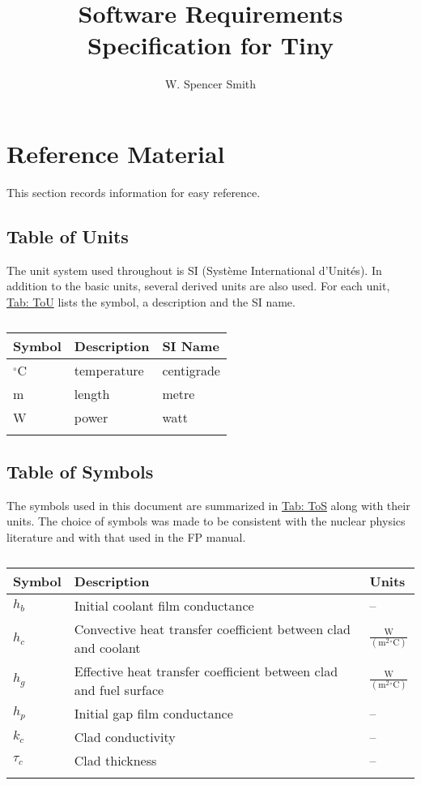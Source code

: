 \documentclass[12pt]{article}
\title{Software Requirements Specification for Tiny}
\author{W. Spencer Smith}
\begin{document}
\maketitle
\tableofcontents
\newpage
\section{Reference Material}
\label{Sec:RefMat}
This section records information for easy reference.
\subsection{Table of Units}
\label{Sec:ToU}
The unit system used throughout is SI (Système International d'Unités). In addition to the basic units, several derived units are also used. For each unit, \hyperref[Table:ToU]{Tab: ToU} lists the symbol, a description and the SI name.
\begin{longtable}{l l l}
\toprule
\textbf{Symbol} & \textbf{Description} & \textbf{SI Name}
\\
\midrule
\endhead
${}^{\circ}$C & temperature & centigrade
\\
m & length & metre
\\
W & power & watt
\\
\bottomrule
\caption{}
\label{Table:ToU}
\end{longtable}
\subsection{Table of Symbols}
\label{Sec:ToS}
The symbols used in this document are summarized in \hyperref[Table:ToS]{Tab: ToS} along with their units. The choice of symbols was made to be consistent with the nuclear physics literature and with that used in the FP manual.
\begin{longtabu}{l X[l] l}
\toprule
\textbf{Symbol} & \textbf{Description} & \textbf{Units}
\\
\midrule
\endhead
${h_{b}}$ & Initial coolant film conductance & --
\\
${h_{c}}$ & Convective heat transfer coefficient between clad and coolant & $\frac{\text{W}}{(\text{m}^{2}{}^{\circ}\text{C})}$
\\
${h_{g}}$ & Effective heat transfer coefficient between clad and fuel surface & $\frac{\text{W}}{(\text{m}^{2}{}^{\circ}\text{C})}$
\\
${h_{p}}$ & Initial gap film conductance & --
\\
${k_{c}}$ & Clad conductivity & --
\\
${τ_{c}}$ & Clad thickness & --
\\
\bottomrule
\caption{}
\label{Table:ToS}
\end{longtabu}
\end{document}
